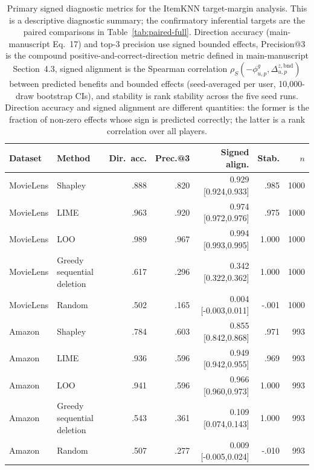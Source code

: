 \begin{table}[!htbp]
\centering\scriptsize
\setlength{\tabcolsep}{3pt}
\caption{Primary signed diagnostic metrics for the ItemKNN target-margin analysis. This is a descriptive diagnostic summary; the confirmatory inferential targets are the paired comparisons in Table~\ref{tab:paired-full}. Direction accuracy (main-manuscript Eq.~17) and top-$3$ precision use signed bounded effects, Precision@3 is the compound positive-and-correct-direction metric defined in main-manuscript Section~4.3, signed alignment is the Spearman correlation $\rho_S(-\phi^g_{u,p},\Delta^{z,\mathrm{bnd}}_{u,p})$ between predicted benefits and bounded effects (seed-averaged per user, 10,000-draw bootstrap CIs), and stability is rank stability across the five seed runs. Direction accuracy and signed alignment are different quantities: the former is the fraction of non-zero effects whose sign is predicted correctly; the latter is a rank correlation over all players.}
\label{tab:app-diagnostics}
\begin{tabular}{@{}p{}p{}rrrrr@{}}
\toprule
Dataset & Method & Dir.\ acc. & Prec.@3 & Signed align. & Stab. & $n$ \\
\midrule
MovieLens & Shapley & .888 & .820 & 0.929 [0.924,0.933] & .985 & 1000 \\
MovieLens & LIME & .963 & .920 & 0.974 [0.972,0.976] & .975 & 1000 \\
MovieLens & LOO & .989 & .967 & 0.994 [0.993,0.995] & 1.000 & 1000 \\
MovieLens & Greedy sequential deletion & .617 & .296 & 0.342 [0.322,0.362] & 1.000 & 1000 \\
MovieLens & Random & .502 & .165 & 0.004 [-0.003,0.011] & -.001 & 1000 \\
Amazon & Shapley & .784 & .603 & 0.855 [0.842,0.868] & .971 & 993 \\
Amazon & LIME & .936 & .596 & 0.949 [0.942,0.955] & .969 & 993 \\
Amazon & LOO & .941 & .596 & 0.966 [0.960,0.973] & 1.000 & 993 \\
Amazon & Greedy sequential deletion & .543 & .361 & 0.109 [0.074,0.143] & 1.000 & 993 \\
Amazon & Random & .507 & .277 & 0.009 [-0.005,0.024] & -.010 & 993 \\
\bottomrule
\end{tabular}
\end{table}